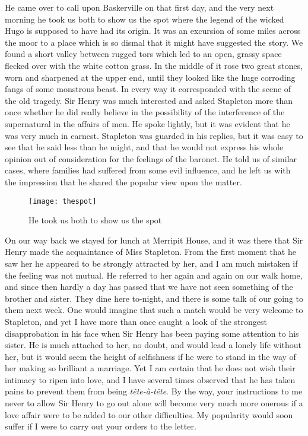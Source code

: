 He came over to call upon Baskerville on that first day, and the very next morning he took us both to show us the spot where the legend of the wicked Hugo is supposed to have had its origin. It was an excursion of some miles across the moor to a place which is so dismal that it might have suggested the story. We found a short valley between rugged tors which led to an open, grassy space flecked over with the white cotton grass. In the middle of it rose two great stones, worn and sharpened at the upper end, until they looked like the huge corroding fangs of some monstrous beast. In every way it corresponded with the scene of the old tragedy. Sir Henry was much interested and asked Stapleton more than once whether he did really believe in the possibility of the interference of the supernatural in the affairs of men. He spoke lightly, but it was evident that he was very much in earnest. Stapleton was guarded in his replies, but it was easy to see that he said less than he might, and that he would not express his whole opinion out of consideration for the feelings of the baronet. He told us of similar cases, where families had suffered from some evil influence, and he left us with the impression that he shared the popular view upon the matter.

\begin{figure}[p]
\centering
\texttt{[image: thespot]}
\caption{He took us both to show us the spot}
\end{figure}

On our way back we stayed for lunch at Merripit House, and it was there that Sir Henry made the acquaintance of Miss Stapleton. From the first moment that he saw her he appeared to be strongly attracted by her, and I am much mistaken if the feeling was not mutual. He referred to her again and again on our walk home, and since then hardly a day has passed that we have not seen something of the brother and sister. They dine here to-night, and there is some talk of our going to them next week. One would imagine that such a match would be very welcome to Stapleton, and yet I have more than once caught a look of the strongest disapprobation in his face when Sir Henry has been paying some attention to his sister. He is much attached to her, no doubt, and would lead a lonely life without her, but it would seem the height of selfishness if he were to stand in the way of her making so brilliant a marriage. Yet I am certain that he does not wish their intimacy to ripen into love, and I have several times observed that he has taken pains to prevent them from being \textit{tête-à-tête}. By the way, your instructions to me never to allow Sir Henry to go out alone will become very much more onerous if a love affair were to be added to our other difficulties. My popularity would soon suffer if I were to carry out your orders to the letter.

